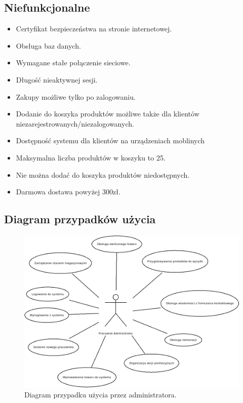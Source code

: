 \documentclass[a4paper,11pt]{article}
\begin{document}
\subsection {Niefunkcjonalne}
\begin{itemize}
	\item Certyfikat bezpieczeństwa na stronie internetowej.
	\item Obsługa baz danych.
	\item Wymagane stałe połączenie sieciowe.
	\item Długość nieaktywnej sesji.
	\item Zakupy możliwe tylko po zalogowaniu.
	\item Dodanie do koszyka produktów możliwe także dla klientów niezarejestrowanych/niezalogowanych.
	\item Dostępność systemu dla klientów na urządzeniach moblinych
	\item Maksymalna liczba produktów w koszyku to 25.
	\item Nie można dodać do koszyka produktów niedostępnych.
	\item Darmowa dostawa powyżej 300zł.
\end{itemize}

\subsection {Diagram przypadków użycia}

\begin{figure}[h]
\centering
\includegraphics[width=12cm]{Diagramy/PrzypadkiUzycia/Admin.jpeg}
\caption{Diagram przypadku użycia przez administratora.}
\end{figure}
\end{document}
